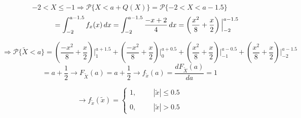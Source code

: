 \documentclass[fleqn]{article}
\begin{document}
\begin{question}
{\[-2<X\leq-1  \Rightarrow \mathcal{P}\{X<a+Q(X) \}= \mathcal{P}\{-2<X<a-1.5 \}   \]
\[ \hspace{1.7cm} = \int_{-2}^{a-1.5}f_x(x)\,dx = \int_{-2}^{a-1.5}\frac{-x+2}{4}\,dx = \left(\frac{x^2}{8}+\frac{x}{2}  \right)\Big|^{a-1.5}_{-2} \]

\[\Rightarrow  \mathcal{P}\{\tilde{X}<a\} =  \left(\frac{-x^2}{8}+\frac{x}{2}  \right)\Big|^{a+1.5}_{1} +  \left(\frac{-x^2}{8}+\frac{x}{2}  \right)\Big|^{a+0.5}_{0} + \left(\frac{x^2}{8}+\frac{x}{2}  \right)\Big|^{a-0.5}_{-1} + \left(\frac{x^2}{8}+\frac{x}{2}  \right)\Big|^{a-1.5}_{-2} \]
\[= a+\frac{1}{2} \rightarrow F_{\tilde{X}}(a) = a+\frac{1}{2} \rightarrow f_{\tilde{x}}(a) =\frac{dF_{\tilde{X}}(a)}{da}= 1  \]

\[\rightarrow \boxed{ f_{\tilde{x}}(\tilde{x}) = \left \{
						\begin{array}{ll}
							1, \hspace{1cm} |\tilde{x}| \leq 0.5 \\~\\
								0,  \hspace{1cm} |\tilde{x}| > 0.5
						\end{array}
						\right.}
\]
}
\end{question}

\end{document}
